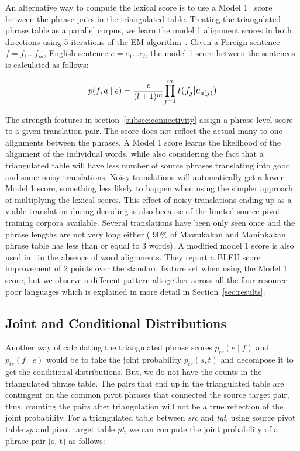         An alternative way to compute the lexical score is to use a Model 1~\cite{Brown:1993} score between the phrase pairs in the triangulated table. Treating the triangulated phrase table as a parallel corpus, we learn the model 1 alignment scores in both directions using 5 iterations of the EM algorithm~\cite{Dempster:77}. Given a Foreign sentence $f = f_{1} \ldots f_{m}$, English sentence $e = e_{1} \ldots e_{l}$, the model 1 score between the sentences is calculated as follows:

                \begin{equation}
                        p(f, a \mid e) = \frac{\epsilon}{(l+1)^m}\mathlarger{\prod\limits_{j=1}^{m}t(f_{j}|e_{a(j)})}
                \end{equation}

        The strength features in section~\ref{subsec:connectivity} assign a phrase-level score to a given translation pair. The score does not reflect the actual many-to-one alignments between the phrases. A Model 1 score learns the likelihood of the alignment of the individual words, while also considering the fact that a triangulated table will have less number of source phrases translating into good and some noisy translations. Noisy translations will automatically get a lower Model 1 score, something less likely to happen when using the simpler approach of multiplying the lexical scores. This effect of noisy translations ending up as a viable translation during decoding is also because of the limited source pivot training corpora available. Several translations have been only seen once and the phrase lengths are not very long either ( 90\% of Mawukakan and Maninkakan phrase table has less than or equal to 3 words). A modified model 1 score is also used in~\cite{Cohn:07} in the absence of word alignments. They report a BLEU score improvement of 2 points over the standard feature set when using the Model 1 score, but we observe a different pattern altogether across all the four resource-poor languages which is explained in more detail in Section~\ref{sec:results}.

\subsection{Joint and Conditional Distributions}
\label{subsec:joint}

Another way of calculating the triangulated phrase scores $p_{tr}(e \mid f)$ and $p_{tr}(f \mid e)$ would be to take the joint probability $p_{tr}(s, t)$ and decompose it to get the conditional distributions. But, we do not have the counts in the triangulated phrase table. The pairs that end up in the triangulated table are contingent on the common pivot phrases that connected the source target pair, thus, counting the pairs after triangulation will not be a true reflection of the joint probability. For a triangulated table between \emph{src} and \emph{tgt}, using source pivot table \emph{sp} and pivot target table \emph{pt}, we can compute the joint probability of a phrase pair (s, t) as follows:

